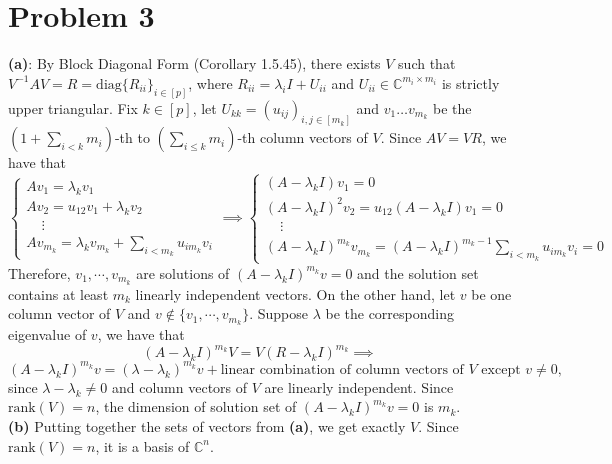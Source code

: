 \documentclass[11pt]{article}
\theoremstyle{plain}
\theoremstyle{definition}
\theoremstyle{remark}
\newcommand{\diag}{\mathrm{diag}}
\newcommand{\C}{\mathbb{C}}
\def\-#1{\mathrm{#1}} %
\begin{document}
\section*{Problem 3}
\textbf{(a)}:
By Block Diagonal Form (Corollary 1.5.45), there exists $V$ such that $V^{-1}AV = R = \diag\{R_{ii}\}_{i\in [p]}$, where $R_{ii} = \lambda_i I + U_{ii}$ and $U_{ii}\in \C^{m_i\times m_i}$ is strictly upper triangular.
Fix $k\in [p]$, let $U_{kk} = (u_{ij})_{i,j\in [m_k]}$ and $v_1\ldots v_{m_k}$ be the $(1+\sum_{i<k}m_i)$-th to $(\sum_{i\leq k}m_i)$-th column vectors of $V$.
Since $AV = VR$, we have that
$$
    \begin{cases}
        Av_1 = \lambda_k v_1
        \\Av_2 = u_{12}v_1 + \lambda_k v_2
        \\\ \ \ \ \ \vdots
        \\Av_{m_k} = \lambda_k v_{m_k} + \sum_{i<m_k} u_{i m_k}v_i
    \end{cases}
    \implies 
    \begin{cases}
        (A - \lambda_k I)v_1 = 0
        \\ (A - \lambda_k I)^2 v_2 = u_{12} (A - \lambda_k I)v_1 = 0
        \\\ \ \ \ \ \vdots
        \\ (A - \lambda_k I)^{m_k}v_{m_k} = (A - \lambda_k I)^{m_k-1}\sum_{i<m_k} u_{i m_k}v_i = 0
    \end{cases}
$$
Therefore, $v_1,\cdots,v_{m_k}$ are solutions of $(A-\lambda_k I)^{m_k}v = 0$ and the solution set contains at least $m_k$ linearly independent vectors.
On the other hand, let $v$ be one column vector of $V$ and $v\notin \{v_1,\cdots,v_{m_k}\}$.
Suppose $\lambda$ be the corresponding eigenvalue of $v$, we have that 
$$
    (A-\lambda_k I)^{m_k}V=V(R - \lambda_k I)^{m_k} \implies
$$
$$
    (A-\lambda_k I)^{m_k}v = (\lambda - \lambda_k)^{m_k}v + \text{linear combination of column vectors of $V$ except $v$} \neq 0,
$$ 
since $\lambda - \lambda_k\neq 0$ and column vectors of $V$ are linearly independent.
Since $\-{rank}(V)=n$, the dimension of solution set of $(A-\lambda_k I)^{m_k}v = 0$ is $m_k$.
\\\textbf{(b)}
Putting together the sets of vectors from \textbf{(a)}, we get exactly $V$. 
Since $\-{rank}(V)=n$, it is a basis of $\C^n$.
\end{document}
